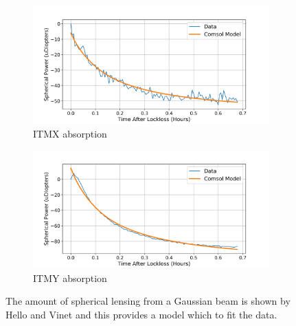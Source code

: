 \begin{figure}[ht]
\centering
\begin{subfigure}[a]{0.7\textwidth}
	\centering
	\includegraphics[width=\textwidth]{../Figures/itmx_HWS_Absorption.png}
	\caption{ITMX absorption}
	\label{fig:itmx_abs}
\end{subfigure}
\hfill
\begin{subfigure}[b]{0.7\textwidth}
	\centering
	\includegraphics[width=\textwidth]{../Figures/itmy_HWS_Absorption.png}
	\caption{ITMY absorption}
	\label{fig:itmy_abs}
\end{subfigure}
\caption{The amount of spherical lensing from a Gaussian beam is shown by Hello and Vinet \cite{Vinet_Thermal_Issues} and this provides a model which to fit the data.}
\label{fig:hws_abs}
\end{figure}

